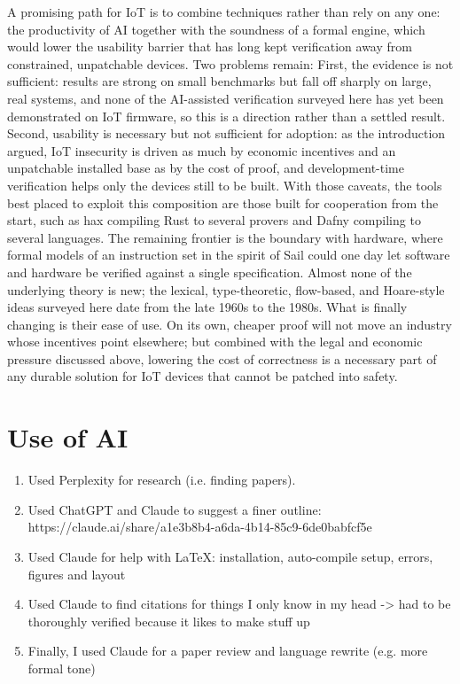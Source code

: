 \documentclass[conference]{IEEEtran}
\begin{document}
A promising path for IoT is to combine techniques rather than rely on any one: the productivity of AI together with the soundness of a formal engine, which would lower the usability barrier that has long kept verification away from constrained, unpatchable devices. Two problems remain: First, the evidence is not sufficient: results are strong on small benchmarks but fall off sharply on large, real systems, and none of the AI-assisted verification surveyed here has yet been demonstrated on IoT firmware, so this is a direction rather than a settled result. Second, usability is necessary but not sufficient for adoption: as the introduction argued, IoT insecurity is driven as much by economic incentives and an unpatchable installed base as by the cost of proof, and development-time verification helps only the devices still to be built. With those caveats, the tools best placed to exploit this composition are those built for cooperation from the start, such as hax compiling Rust to several provers and Dafny compiling to several languages. The remaining frontier is the boundary with hardware, where formal models of an instruction set in the spirit of Sail could one day let software and hardware be verified against a single specification. Almost none of the underlying theory is new; the lexical, type-theoretic, flow-based, and Hoare-style ideas surveyed here date from the late 1960s to the 1980s. What is finally changing is their ease of use. On its own, cheaper proof will not move an industry whose incentives point elsewhere; but combined with the legal and economic pressure discussed above, lowering the cost of correctness is a necessary part of any durable solution for IoT devices that cannot be patched into safety.

\section{Use of AI}

\begin{enumerate}
  \item Used Perplexity for research (i.e. finding papers).
  \item Used ChatGPT and Claude to suggest a finer outline: https://claude.ai/share/a1e3b8b4-a6da-4b14-85c9-6de0babfcf5e
  \item Used Claude for help with LaTeX: installation, auto-compile setup, errors, figures and layout
  \item Used Claude to find citations for things I only know in my head -> had to be thoroughly verified because it likes to make stuff up
  \item Finally, I used Claude for a paper review and language rewrite (e.g. more formal tone)
\end{enumerate}
\end{document}
